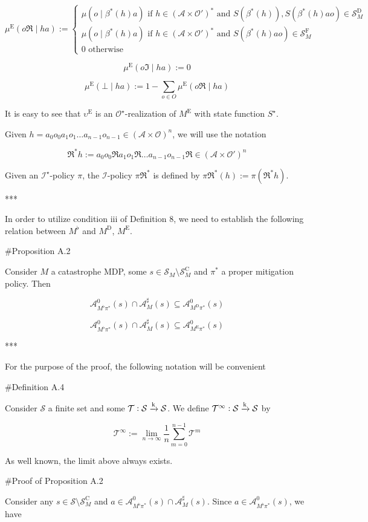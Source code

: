 \documentclass[a4paper]{article}
\newcommand{\AP}[1]{\left(#1\right)}
\newcommand{\M}{\xrightarrow{\textnormal{k}}}
\newcommand{\Ob}{\mathcal{O}}
\newcommand{\A}{\mathcal{A}}
\newcommand{\St}{\mathcal{S}}
\newcommand{\T}{\mathcal{T}}
\newcommand{\In}{\mathcal{I}}
\newcommand{\RMC}{\mathrm{C}}
\newcommand{\RMD}{\mathrm{D}}
\newcommand{\RME}{\mathrm{E}}
\newcommand{\RMF}{\mathrm{F}}
\newcommand{\SF}{\St^{\RMF}}
\newcommand{\SD}{\St^{\RMD}}
\newcommand{\SC}{\St^{\RMC}}
\newcommand{\MD}{M^{\RMD}}
\newcommand{\ME}{M^{\RME}}
\begin{document}
$$\mu^\RME(o\Re \mid ha) := \begin{cases} \mu\AP{o \mid \beta^*(h)a} \text{ if } h\in\AP{\A \times \Ob'}^* \text{ and } S\AP{\beta^*(h)},S\AP{\beta^*(h)ao}\in\SD_M \\ \mu\AP{o \mid \beta^*(h)a} \text{ if } h\in\AP{\A \times \Ob'}^* \text{ and } S\AP{\beta^*(h)ao}\in\SF_M \\ 0 \text{ otherwise} \end{cases}$$

$$\mu^\RME(o\Im \mid ha) := 0$$

$$\mu^\RME(\bot \mid ha) := 1 - \sum_{o \in O} \mu^\RME(o\Re \mid ha)$$

It is easy to see that $\upsilon^\RME$ is an $\Ob^\star$-realization of $\ME$ with state function $S^\star$.

Given $h = a_0 o_0 a_1 o_1 \ldots a_{n-1} o_{n-1} \in \AP{\A \times \Ob}^n$, we will use the notation

$$\Re^*h := a_0 o_0 \Re a_1 o_1 \Re \ldots a_{n-1} o_{n-1} \Re \in \AP{\A \times \Ob'}^n$$ 

Given an $\In^\star$-policy $\pi$, the $\In$-policy $\pi\Re^*$ is defined by $\pi\Re^*(h) := \pi\AP{\Re^*h}$.

***

In order to utilize condition iii of Definition 8, we need to establish the following relation between $M^\flat$ and $\MD$, $\ME$.

\#Proposition A.2

Consider $M$ a catastrophe MDP, some $s \in \St_M \setminus \SC_M$ and $\pi^*$ a proper mitigation policy. Then

$$\A_{M^\flat\pi^*}^0\AP{s} \cap \A_M^\sharp(s) \subseteq \A_{\MD\pi^*}^0\AP{s}$$

$$\A_{M^\flat\pi^*}^0\AP{s} \cap \A_M^\sharp(s) \subseteq \A_{\ME\pi^*}^0\AP{s}$$

***

For the purpose of the proof, the following notation will be convenient

\#Definition A.4

Consider $\St$ a finite set and some $\T: \St \M \St$. We define $\T^\infty: \St \M \St$ by

$$\T^\infty := \lim_{n \rightarrow \infty} \frac{1}{n} \sum_{m = 0}^{n-1} \T^m$$

As well known, the limit above always exists.

\#Proof of Proposition A.2

Consider any $s \in \St \setminus \SC_M$ and $a \in \A_{M^\flat\pi^*}^0\AP{s} \cap \A_M^\sharp(s)$. Since $a \in \A_{M^\flat\pi^*}^0\AP{s}$, we have
\end{document}
